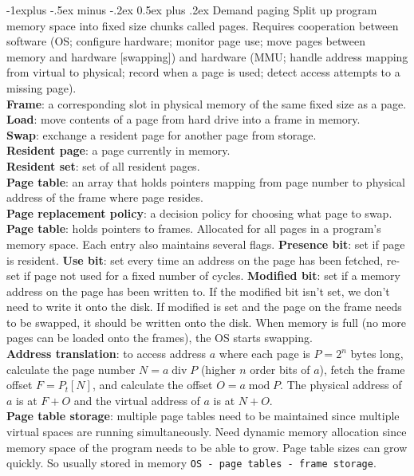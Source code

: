 \documentclass[10pt,landscape]{article}
\makeatletter
\renewcommand{\subsection}{\@startsection{subsection}{2}{0mm}%
                                {-1explus -.5ex minus -.2ex}%
                                {0.5ex plus .2ex}%
                                {\normalfont\scriptsize\bfseries}}
\makeatother
\begin{document}
\begin{multicols}{3}
\subsection{Demand paging}
Split up program memory space into fixed size chunks called pages. Requires cooperation between software (OS; configure hardware; monitor page use; move pages between memory and hardware [swapping]) and hardware (MMU; handle address mapping from virtual to physical; record when a page is used; detect access attempts to a missing page).\\
\textbf{Frame}: a corresponding slot in physical memory of the same fixed size as a page.\\
\textbf{Load}: move contents of a page from hard drive into a frame in memory.\\
\textbf{Swap}: exchange a resident page for another page from storage.\\
\textbf{Resident page}: a page currently in memory.\\
\textbf{Resident set}: set of all resident pages.\\
\textbf{Page table}: an array that holds pointers mapping from page number to physical address of the frame where page resides.\\
\textbf{Page replacement policy}: a decision policy for choosing what page to swap.\\
\textbf{Page table}: holds pointers to frames. Allocated for all pages in a program's memory space. Each entry also maintains several flags. \textbf{Presence bit}: set if page is resident. \textbf{Use bit}: set every time an address on the page has been fetched, re-set if page not used for a fixed number of cycles. \textbf{Modified bit}: set if a memory address on the page has been written to. If the modified bit isn't set, we don't need to write it onto the disk. If modified is set and the page on the frame needs to be swapped, it should be written onto the disk. When memory is full (no more pages can be loaded onto the frames), the OS starts swapping.\\
\textbf{Address translation}: to access address $a$ where each page is $P=2^n$ bytes long, calculate the page number $N=a\operatorname{div} P$ (higher $n$ order bits of $a$), fetch the frame offset $F=P_t[N]$, and calculate the offset $O=a\operatorname{mod}P$. The physical address of $a$ is at $F+O$ and the virtual address of $a$ is at $N+O$. \\
\textbf{Page table storage}: multiple page tables need to be maintained since multiple virtual spaces are running simultaneously. Need dynamic memory allocation since memory space of the program needs to be able to grow. Page table sizes can grow quickly. So usually stored in memory \texttt{OS - page tables - frame storage}. \\

\end{multicols}
\end{document}
